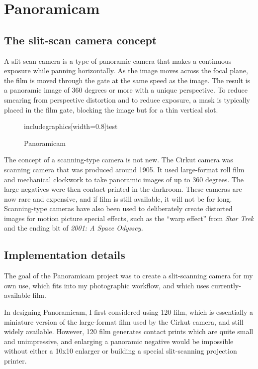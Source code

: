 \documentclass[dvips,12pt]{article}
\begin{document}
\section{Panoramicam}

\subsection{The slit-scan camera concept}
A slit-scan camera is a type of panoramic camera that makes a continuous exposure while panning horizontally. As the image moves across the focal plane, the film is moved through the gate at the same speed as the image. The result is a panoramic image of 360 degrees or more with a unique perspective. To reduce smearing from perspective distortion and to reduce exposure, a mask is typically placed in the film gate, blocking the image but for a thin vertical slot.

\begin{figure}
\centering
includegraphics[width=0.8\textwidth]{test}
\caption{Panoramicam}
\label{fig:Panoramicam}
\end{figure}

The concept of a scanning-type camera is not new. The Cirkut camera was scanning camera that was produced around 1905. It used large-format roll film and mechanical clockwork to take panoramic images of up to 360 degrees. The large negatives were then contact printed in the darkroom. These cameras are now rare and expensive, and if film is still available, it will not be for long. Scanning-type cameras have also been used to deliberately create distorted images for motion picture special effects, such as the ``warp effect'' from \emph{Star Trek} and the ending bit of \emph{2001: A Space Odyssey.}

\subsection{Implementation details}

The goal of the Panoramicam project was to create a slit-scanning camera for my own use, which fits into my photographic workflow, and which uses currently-available film.

In designing Panoramicam, I first considered using 120 film, which is essentially a miniature version of the large-format film used by the Cirkut camera, and still widely available. However, 120 film generates contact prints which are quite small and unimpressive, and enlarging a panoramic negative would be impossible without either a 10x10 enlarger or building a special slit-scanning projection printer. 
\end{document}
